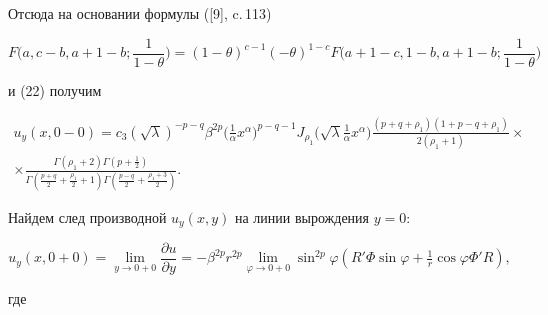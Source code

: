 Отсюда на основании формулы ([9], c.\,113) 


$$ 


F\bigg(a,c-b,a+1-b;\frac{1}{1-\theta}\bigg)=(1-\theta)^{c-1} 


(-\theta)^{1-c}F\bigg(a+1-c,1-b,a+1-b;\frac{1}{1-\theta}\bigg) 


$$ 


и (22) получим 


\begin{multline*} 


u_y(x,0-0)=c_3(\sqrt{\lambda})^{-p-q}\beta^{2p}\bigg( 


\frac{1}{\alpha}x^\alpha\bigg)^{p-q-1}J_{\rho_1}\bigg(\sqrt{\lambda} 


\frac{1}{\alpha}x^\alpha\bigg) 


\frac{(p+q+\rho_1)(1+p-q+\rho_1)} 


{2(\rho_1+1)} \times \\ 


% 


\times\frac{\Gamma(\rho_1+2)\Gamma(p+\frac12)} 


{\Gamma(\frac{p+q}{2}+\frac{\rho_1}{2}+1)\Gamma(\frac{p-q}{2}+ 


\frac{\rho_1+3}{2})}. 


\end{multline*} 


 


Найдем след производной $u_y(x,y)$ на линии вырождения $y=0$: 


\begin{equation} 


u_y(x,0+0)=\lim_{y\to0+0}\frac{\partial u}{\partial y}= 


-\beta^{2p}r^{2p}\lim_{\varphi\to0+0}\sin^{2p}\varphi 


(R'\Phi\sin\varphi+\tfrac{1}{r}\cos\varphi\Phi' R), 


\end{equation} 


где 


